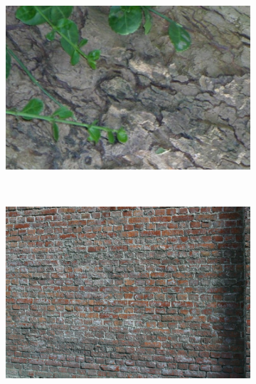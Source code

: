 \documentclass[10pt,twocolumn,letterpaper]{article}
\begin{document}
\begin{figure}[htb]
\begin{subfigure}[t]{0.20\columnwidth}
    \end{subfigure}%
    ~ %
    \begin{subfigure}[t]{0.24\columnwidth}
        \centering
        \includegraphics[width=1\columnwidth]{images/acr/bark1}
    \end{subfigure}%
    ~ %
    \begin{subfigure}[t]{0.23\columnwidth}
        \centering
        \includegraphics[width=1\columnwidth]{images/acr/wall1}
    \end{subfigure}%
    \vspace{1.5 mm}


\end{figure}
\end{document}
